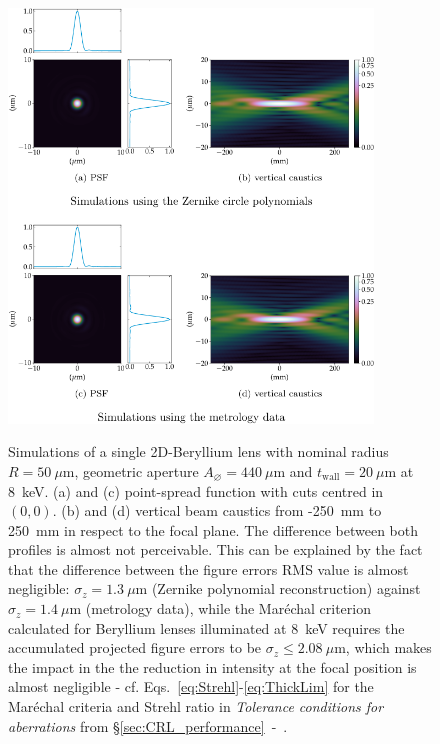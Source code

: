 \begin{refsection}
\begin{figure}[t]
        \centering
        {\includegraphics[height=11cm]{figures/ch04/metrology_zernike_simualtions.pdf}}
        \caption[Effects of other sources of deviations from the parabolic shape]{Simulations of a single 2D-Beryllium lens with nominal radius $R=50~\mu\text{m}$, geometric aperture $A_{\diameter}=440~\mu\text{m}$ and $t_\text{wall}=20~\mu$m at 8~keV. (a) and (c) point-spread function with cuts centred in $(0,0)$. (b) and (d) vertical beam caustics from -250~mm to 250~mm in respect to the focal plane. The difference between both profiles is almost not perceivable. This can be explained by the fact that the difference between the figure errors RMS value is almost negligible:  $\sigma_z=1.3~\mu$m (Zernike polynomial reconstruction) against $\sigma_z=1.4~\mu$m (metrology data), while the Mar\'echal criterion calculated for Beryllium lenses illuminated at $8$~keV requires the accumulated projected figure errors to be $\sigma_z\leq2.08~\mu$m, which makes the impact in the the reduction in intensity at the focal position is almost negligible - cf. Eqs.~\ref{eq:Strehl}-\ref{eq:ThickLim} for the Mar\'echal criteria and Strehl ratio in \textit{Tolerance conditions for aberrations} from \S\ref{sec:CRL_performance}~-~\textit{}.}\label{fig:metrology_zernike_simualtions}
\end{figure}


\end{refsection}
